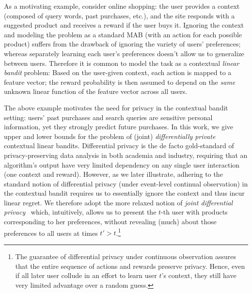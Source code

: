 \documentclass{article}
\begin{document}

As a motivating example, consider online shopping: the user provides a
context (composed of query words, past purchases, etc.), and the site
responds with a suggested product and receives a reward if the user
buys it.  Ignoring the context and modeling the problem as a standard
MAB (with an action for each possible product) suffers from the
drawback of ignoring the variety of users' preferences; whereas separately
learning each user's preferences doesn't allow us to generalize
between users.  Therefore it is common to model the task as a
contextual \emph{linear bandit} problem: Based on the user-given
context, each action is mapped to a feature vector; the
reward probability is then assumed to depend on the \emph{same} unknown linear
function of the feature vector across all users.

The above example motivates the need for privacy in the contextual
bandit setting: users' past purchases and search queries are sensitive personal
information, yet they strongly predict future purchases.
In this work, we give upper and lower bounds for the
problem of (joint) \emph{differentially private} contextual linear
bandits. Differential privacy is the de facto gold-standard of
privacy-preserving data analysis in both academia and industry,
requiring that an algorithm's output have very limited dependency on
any single user interaction (one context and reward).  However, as we
later illustrate, adhering to the standard notion of differential
privacy (under event-level continual observation) in the contextual bandit
requires us to essentially ignore the context and thus incur linear
regret.  We therefore adopt the more relaxed notion of \emph{joint
  differential privacy}~\citep{KearnsMechanismDesign2014} which,
intuitively, allows us to present the $t$-th user with products
corresponding to her preferences, without revealing (much) about those
preferences to all users at times $t'>t$.\footnote{The guarantee of
  differential privacy under continuous observation assures that the
  entire sequence of actions and rewards preserve privacy.  Hence,
  even if all later user collude in an effort to learn user $t$'s
  context, they still have very limited advantage over a random
  guess.}
\end{document}
